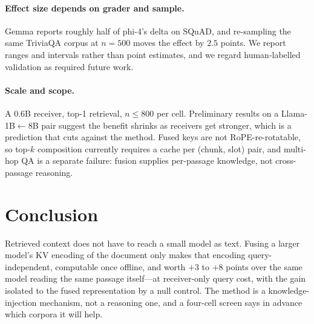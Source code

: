 \documentclass[sigconf,anonymous,review]{acmart}
\begin{document}
\paragraph{Effect size depends on grader and sample.} Gemma reports roughly half of phi-4's delta
on SQuAD, and re-sampling the same TriviaQA corpus at $n{=}500$ moves the effect by $2.5$ points.
We report ranges and intervals rather than point estimates, and we regard human-labelled
validation as required future work.

\paragraph{Scale and scope.} A 0.6B receiver, top-1 retrieval, $n{\le}800$ per cell. Preliminary
results on a Llama-1B$\leftarrow$8B pair suggest the benefit shrinks as receivers get stronger,
which is a prediction that cuts against the method. Fused keys are not RoPE-re-rotatable, so
top-$k$ composition currently requires a cache per (chunk, slot) pair, and multi-hop QA is a
separate failure: fusion supplies per-passage knowledge, not cross-passage reasoning.

\section{Conclusion}

Retrieved context does not have to reach a small model as text. Fusing a larger model's KV
encoding of the document only makes that encoding query-independent, computable once offline, and
worth $+3$ to $+8$ points over the same model reading the same passage itself---at receiver-only
query cost, with the gain isolated to the fused representation by a null control. The method is a
knowledge-injection mechanism, not a reasoning one, and a four-cell screen says in advance which
corpora it will help.

\end{document}
